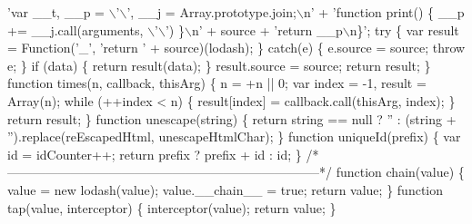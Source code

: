 \begin{DoxyCodeInclude}
{{\textcolor{stringliteral}{      'var \_\_t, \_\_p = \(\backslash\)'\(\backslash\)', \_\_j = Array.prototype.join;\(\backslash\)n' +}
\textcolor{stringliteral}{      'function print() \{ \_\_p += \_\_j.call(arguments, \(\backslash\)'\(\backslash\)') \}\(\backslash\)n' +}
\textcolor{stringliteral}{      source +}
\textcolor{stringliteral}{      'return \_\_p\(\backslash\)n\}';}
\textcolor{stringliteral}{}
\textcolor{stringliteral}{    try \{}
\textcolor{stringliteral}{      var result = Function('\_', 'return ' + source)(lodash);}
\textcolor{stringliteral}{    \} catch(e) \{}
\textcolor{stringliteral}{      e.source = source;}
\textcolor{stringliteral}{      throw e;}
\textcolor{stringliteral}{    \}}
\textcolor{stringliteral}{    if (data) \{}
\textcolor{stringliteral}{      return result(data);}
\textcolor{stringliteral}{    \}}
\textcolor{stringliteral}{    result.source = source;}
\textcolor{stringliteral}{    return result;}
\textcolor{stringliteral}{  \}}
\textcolor{stringliteral}{}
\textcolor{stringliteral}{  function times(n, callback, thisArg) \{}
\textcolor{stringliteral}{    n = +n || 0;}
\textcolor{stringliteral}{    var index = -1,}
\textcolor{stringliteral}{        result = Array(n);}
\textcolor{stringliteral}{}
\textcolor{stringliteral}{    while (++index < n) \{}
\textcolor{stringliteral}{      result[index] = callback.call(thisArg, index);}
\textcolor{stringliteral}{    \}}
\textcolor{stringliteral}{    return result;}
\textcolor{stringliteral}{  \}}
\textcolor{stringliteral}{}
\textcolor{stringliteral}{  function unescape(string) \{}
\textcolor{stringliteral}{    return string == null ? '' : (string + '').replace(reEscapedHtml, unescapeHtmlChar);}
\textcolor{stringliteral}{  \}}
\textcolor{stringliteral}{}
\textcolor{stringliteral}{  function uniqueId(prefix) \{}
\textcolor{stringliteral}{    var id = idCounter++;}
\textcolor{stringliteral}{    return prefix ? prefix + id : id;}
\textcolor{stringliteral}{  \}}
\textcolor{stringliteral}{}
\textcolor{stringliteral}{  /*--------------------------------------------------------------------------*/}
\textcolor{stringliteral}{}
\textcolor{stringliteral}{  function chain(value) \{}
\textcolor{stringliteral}{    value = new lodash(value);}
\textcolor{stringliteral}{    value.\_\_chain\_\_ = true;}
\textcolor{stringliteral}{    return value;}
\textcolor{stringliteral}{  \}}
\textcolor{stringliteral}{}
\textcolor{stringliteral}{  function tap(value, interceptor) \{}
\textcolor{stringliteral}{    interceptor(value);}
\textcolor{stringliteral}{    return value;}
\textcolor{stringliteral}{  \}}
\textcolor{stringliteral}{}
}}
\end{DoxyCodeInclude}
